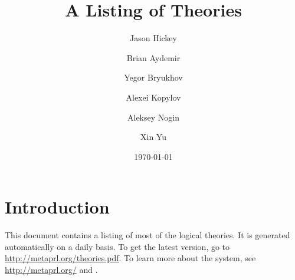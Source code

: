 \documentclass{article}
\begin{document}
\author{Jason Hickey\and Brian Aydemir\and Yegor Bryukhov\and Alexei
Kopylov\and Aleksey Nogin\and Xin Yu}
\title{A Listing of \MetaPRL{} Theories}
\date{\today}
\maketitle
\section{Introduction}
This document contains a listing of most of the \MetaPRL{}
logical theories. It is generated automatically on a daily basis. To get the
latest version, go to \url{http://metaprl.org/theories.pdf}. To learn more
about the \MetaPRL{} system, see \url{http://metaprl.org/} and \cite{Hic01}.

\sloppy


\printindex



\end{document}
